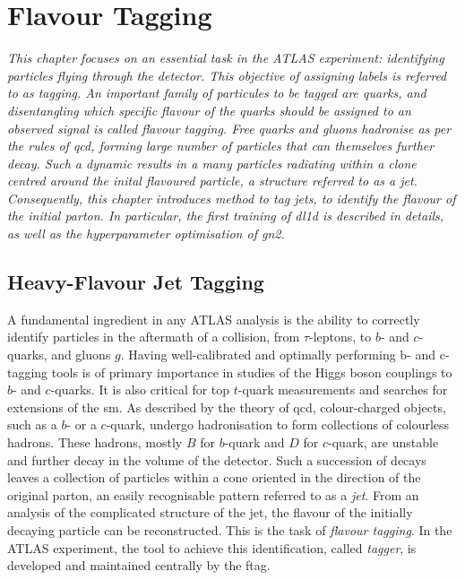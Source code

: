 \chapter{\color{oxfordblue} Flavour Tagging}\label{chap-ftag}
\ChapFrame

\textit{
This chapter focuses on an essential task in the ATLAS experiment: identifying particles flying through the detector. This objective of assigning labels is referred to as tagging. An important family of particules to be tagged are quarks, and disentangling which specific flavour of the quarks should be assigned to an observed signal is called flavour tagging. Free quarks and gluons hadronise as per the rules of \gls{qcd}, forming large number of particles that can themselves further decay. Such a dynamic results in a many particles radiating within a clone centred around the inital flavoured particle, a structure referred to as a jet. Consequently, this chapter introduces method to tag jets, to identify the flavour of the initial parton. In particular, the first training of \gls{dl1d} is described in details, as well as the hyperparameter optimisation of \gls{gn2}.
}

\section{Heavy-Flavour Jet Tagging}
A fundamental ingredient in any ATLAS analysis is the ability to correctly identify particles in the aftermath of a collision, from $\tau$-leptons, to $b$- and $c$-quarks, and gluons $g$. Having well-calibrated and optimally performing b- and c-tagging tools is of primary importance in studies of the Higgs boson couplings to $b$- and $c$-quarks. It is also critical for top $t$-quark measurements and searches for extensions of the \gls{sm}. As described by the theory of \gls{qcd}, colour-charged objects, such as a $b$- or a $c$-quark, undergo hadronisation to form collections of colourless hadrons. These hadrons, mostly $B$ for $b$-quark and $D$ for $c$-quark, are unstable and further decay in the volume of the detector. Such a succession of decays leaves a collection of particles within a cone oriented in the direction of the original parton, an easily recognisable pattern referred to as a \textit{jet}. From an analysis of the complicated structure of the jet, the flavour of the initially decaying particle can be reconstructed. This is the task of \textit{flavour tagging}. In the ATLAS experiment, the tool to achieve this identification, called \textit{tagger}, is developed and maintained centrally by the \gls{ftag}. \\

